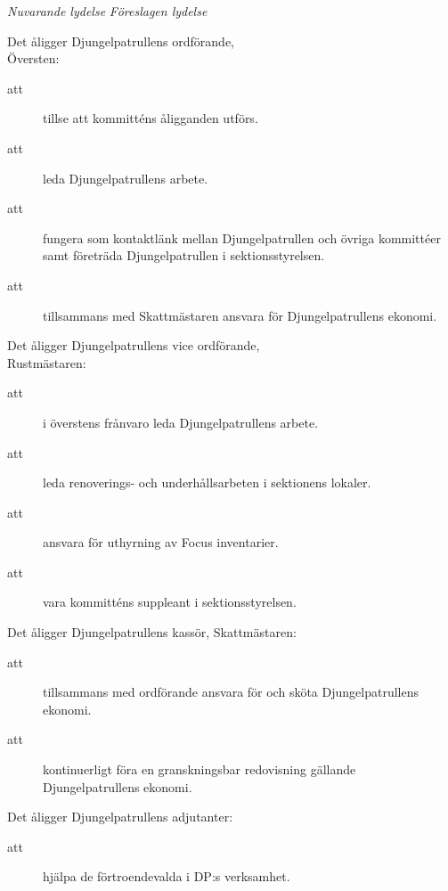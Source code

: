 \documentclass{article}
\newenvironment{lydelse}
    {\begin{paracol}{2}%
        \emph{Nuvarande lydelse}%
        \switchcolumn%
        \emph{Föreslagen lydelse}%
    \end{paracol}%
    \begin{enumerate}[label=\thesubsection.\arabic*]%
    \begin{paracol}{2}%
    }{\end{paracol}\end{enumerate}}
\begin{document}
\begin{lydelse}
	\vspace{1.15em}
	\item Det åligger Djungelpatrullens ordförande, \\ Översten:
	\begin{description}
		\item[att] tillse att kommitténs åligganden utförs. 
		\item[att] leda Djungelpatrullens arbete.
		\item[att] fungera som kontaktlänk mellan Djungelpatrullen och övriga kommittéer samt företräda Djungelpatrullen i sektionsstyrelsen.
		\item[att] tillsammans med Skattmästaren ansvara för Djungelpatrullens ekonomi.
	\end{description}
	
	\item Det åligger Djungelpatrullens vice ordförande, \\ Rustmästaren:
	\begin{description}
		\item[att] i överstens frånvaro leda Djungelpatrullens arbete.
		\item[att] leda renoverings- och underhållsarbeten i sektionens lokaler.
		\item[att] ansvara för uthyrning av Focus inventarier.
		\item[att] vara kommitténs suppleant i sektionsstyrelsen.
	\end{description}
	
	\item Det åligger Djungelpatrullens kassör, Skattmästaren:
	\begin{description}
		\item[att] tillsammans med ordförande ansvara för och sköta Djungelpatrullens ekonomi.
		\item[att] kontinuerligt föra en granskningsbar redovisning gällande Djungelpatrullens ekonomi.
	\end{description}

    \item Det åligger Djungelpatrullens adjutanter:
	\begin{description}
		\item[att] hjälpa de förtroendevalda i DP:s verksamhet.
	\end{description}
	
	\setcounter{section}{5}
    \setcounter{subsection}{6}
    
    \switchcolumn
    

\end{lydelse}
\end{document}
